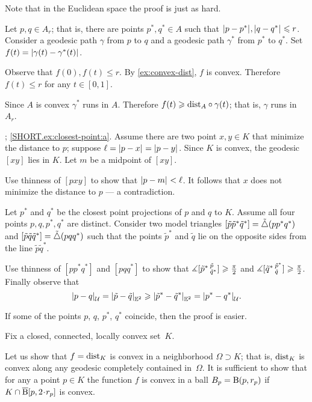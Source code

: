  Note that in the Euclidean space the proof is just as hard.

Let $p,q\in A_r$;
that is, there are points $p^*,q^*\in A$ such that $\dist{p}{p^*}{},\dist{q}{q^*}{}\le r$.
Consider a geodesic path $\gamma$ from $p$ to $q$ and a geodesic path $\gamma^*$ from $p^*$ to $q^*$.
Set $f(t)=\dist{\gamma(t)}{\gamma^*(t)}{}$.

Observe that $f(0),f(t)\le r$.
By \ref{ex:convex-dist}, $f$ is convex.
Therefore $f(t)\le r$ for any $t\in[0,1]$.

Since $A$ is convex $\gamma^*$ runs in $A$.
Therefore $f(t)\geqslant \mathrm{dist}_A\circ\gamma(t)$;
that is, $\gamma$  runs in $A_r$.

\parbf{\ref{ex:closest-point}}; \ref{SHORT.ex:closest-point:a}.
Assume there are two point $x,y\in K$ that minimize the distance to $p$;
suppose $\ell=\dist{p}{x}{}=\dist{p}{y}{}$.
Since $K$ is convex, the geodesic $[xy]$ lies in $K$.
Let $m$ be a midpoint of $[xy]$.

Use thinness of $[pxy]$ to show that $\dist{p}{m}{}<\ell$.
It follows that $x$ does not minimize the distance to $p$ --- a contradiction.

Let $p^*$ and $q^*$ be the closest point projections of $p$ and $q$ to $K$.
Assume all four points $p,q,p^*,q^*$ are distinct.
Consider two model triangles $[\tilde p\tilde p^*\tilde q^*]=\tilde\triangle(pp^*q^*)$ and $[\tilde p\tilde q\tilde q^*]=\tilde\triangle(pqq^*)$ 
such that the points $\tilde p^*$ and $\tilde q$ lie on the opposite sides from the line $\tilde p\tilde q^*$.

Use thinness of $[pp^*q^*]$ and $[pqq^*]$ to show that $\measuredangle[\tilde p^*\,{}^{\tilde p}_{\tilde q^*}]\geqslant \tfrac\pi2$ and $\measuredangle[\tilde q^*\,{}^{\tilde p^*}_{\tilde q}]\geqslant \tfrac\pi2$.
Finally observe that 
\[\dist{p}{q}{\spc{U}}=\dist{\tilde p}{\tilde q}{\EE^2}\ge \dist{\tilde p^*}{\tilde q^*}{\EE^2}=\dist{p^*}{q^*}{\spc{U}}.\]

If some of the points $p$, $q$, $p^*$, $q^*$ coincide, then the proof is easier.

 Fix a closed, connected, locally convex set~$K$.

Let us show that $f=\mathrm{dist}_K$ is convex in a neighborhood $\Omega\supset K$; that is, $\mathrm{dist}_K$ is convex along any geodesic completely contained in~$\Omega$.
It is sufficient to show that for any a point $p\in K$ the function $f$ is convex in a ball $B_p= \mathrm{B}{}(p, r_p)$ if $K\cap \cBall[p,2\cdot r_p]$ is convex.

